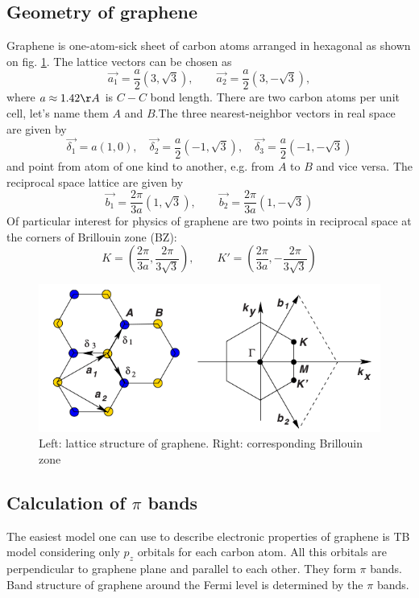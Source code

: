 \subsection{Geometry of graphene}
Graphene is one-atom-sick sheet of carbon atoms arranged in hexagonal as shown on fig. \ref{fig:graphene_lattice}. The lattice vectors can be chosen as 
\begin{equation}
	\vec{a_1} = \frac{a}{2} (3, \sqrt{3}), \qquad \vec{a_2} = \frac{a}{2} (3, - \sqrt{3}),
\end{equation}
where $a \approx 1.42 \AA$ is $C-C$ bond length. There are two carbon atoms per unit cell, let's name them $A$ and $B$.The three nearest-neighbor vectors in real space are given by 
\begin{equation}
	\vec{\delta_1} = a (1, 0), \quad \vec{\delta_2} = \frac{a}{2} (-1, \sqrt{3}), \quad \vec{\delta_3} = \frac{a}{2} (-1, -\sqrt{3})
\end{equation}
and point from atom of one kind to another, e.g. from $A$ to $B$ and vice versa.
The reciprocal space lattice are given by
\begin{equation}
	\vec{b_1} = \frac{2 \pi}{3 a}(1, \sqrt{3}), \qquad \vec{b_2} = \frac{2 \pi}{3 a} (1, -\sqrt{3})
\end{equation}
Of particular interest for physics of graphene are two points in reciprocal space at the corners of Brillouin zone (BZ):
\begin{equation}
	K = (\frac{2 \pi}{3 a}, \frac{2 \pi}{3 \sqrt{3}}), \qquad K' = (\frac{2 \pi}{3 a}, -\frac{2 \pi}{3 \sqrt{3}})
\end{equation}

\begin{figure}[ht]
\begin{center}
  \includegraphics[width=0.55\linewidth]{img/graphene_lattice}
  \caption{Left: lattice structure of graphene. Right: corresponding Brillouin zone \label{fig:graphene_lattice}}
\end{center}
\end{figure}

\subsection{Calculation of $\pi$ bands}
The easiest model one can use to describe electronic properties of graphene is TB model considering only $p_z$ orbitals for each carbon atom. All this orbitals are perpendicular to graphene plane and parallel to each other. They form $\pi$ bands. Band structure of graphene around the Fermi level is determined by the $\pi$ bands. 

